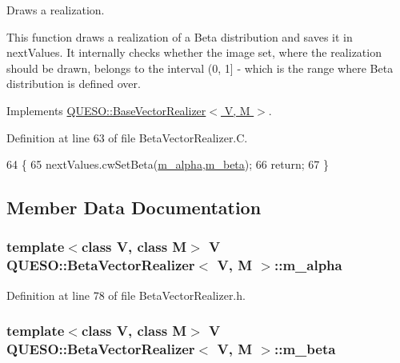 Draws a realization. 

This function draws a realization of a Beta distribution and saves it in {\ttfamily next\-Values}. It internally checks whether the image set, where the realization should be drawn, belongs to the interval (0, 1\mbox{]} -\/ which is the range where Beta distribution is defined over. 

Implements \hyperlink{class_q_u_e_s_o_1_1_base_vector_realizer_a6845173dd79a80ae11c86cde26e55817}{Q\-U\-E\-S\-O\-::\-Base\-Vector\-Realizer$<$ V, M $>$}.



Definition at line 63 of file Beta\-Vector\-Realizer.\-C.


\begin{DoxyCode}
64 \{
65   nextValues.cwSetBeta(\hyperlink{class_q_u_e_s_o_1_1_beta_vector_realizer_a9a1570ec745b892fafe325605a2dcb57}{m\_alpha},\hyperlink{class_q_u_e_s_o_1_1_beta_vector_realizer_a0f2c801dbb06b1a5e41817fb66d3d952}{m\_beta});
66   \textcolor{keywordflow}{return};
67 \}
\end{DoxyCode}


\subsection{Member Data Documentation}
\hypertarget{class_q_u_e_s_o_1_1_beta_vector_realizer_a9a1570ec745b892fafe325605a2dcb57}{
\subsubsection[{m\-\_\-alpha}]{\setlength{\rightskip}{0pt plus 5cm}template$<$class V, class M$>$ V {\bf Q\-U\-E\-S\-O\-::\-Beta\-Vector\-Realizer}$<$ V, M $>$\-::m\-\_\-alpha\hspace{0.3cm}{\ttfamily [private]}}}\label{class_q_u_e_s_o_1_1_beta_vector_realizer_a9a1570ec745b892fafe325605a2dcb57}


Definition at line 78 of file Beta\-Vector\-Realizer.\-h.

\hypertarget{class_q_u_e_s_o_1_1_beta_vector_realizer_a0f2c801dbb06b1a5e41817fb66d3d952}{
\subsubsection[{m\-\_\-beta}]{\setlength{\rightskip}{0pt plus 5cm}template$<$class V, class M$>$ V {\bf Q\-U\-E\-S\-O\-::\-Beta\-Vector\-Realizer}$<$ V, M $>$\-::m\-\_\-beta\hspace{0.3cm}{\ttfamily [private]}}}\label{class_q_u_e_s_o_1_1_beta_vector_realizer_a0f2c801dbb06b1a5e41817fb66d3d952}


